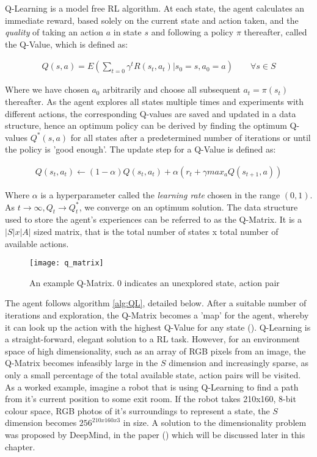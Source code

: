 Q-Learning is a model free RL algorithm. At each state, the agent calculates an immediate reward,
based solely on the current state and action taken, and the \textit{quality} of taking an action $a$
in state $s$ and following a policy $\pi$ thereafter, called the Q-Value, which is defined as:

\begin{align}
    \label{equ:Q}
    Q(s, a) = E(\sum_{t=0}\gamma^tR(s_t, a_t) | s_0 = s, a_0 = a) \qquad \forall s \in S
\end{align}

Where we have chosen $a_0$ arbitrarily and
choose all subsequent $a_t = \pi(s_t)$ thereafter. As the agent explores all states multiple times
and experiments with different actions, the corresponding Q-values are saved and updated in a data
structure, hence an optimum policy can be derived by finding the optimum Q-values $Q^*(s, a)$ for all states after a predetermined number of iterations or until the policy is 'good enough'. The update step for a Q-Value is defined as:

\begin{align}
    \label{equ:QUpdate}
    Q(s_t, a_t) \leftarrow (1-\alpha)Q(s_t, a_t) + \alpha(r_t + \gamma max_aQ(s_{t+1}, a))
\end{align}

Where $\alpha$ is a hyperparameter called the \textit{learning rate} chosen in the range $(0, 1)$. As $t \rightarrow \infty, Q_t \rightarrow Q^*_t$, we converge on an optimum solution. The data structure used to store the agent's experiences can be referred to as the Q-Matrix. It is a
$|S| x |A|$ sized matrix, that is the total number of states x total number of available actions.

\begin{figure}[h]
    \texttt{[image: q\_matrix]}
    \centering
    \caption{An example Q-Matrix. 0 indicates an unexplored state, action pair}
\end{figure}

The agent follows algorithm \ref{alg:QL}, detailed below.
After a suitable number of iterations and exploration, the Q-Matrix becomes a 'map' for the agent,
whereby it can look up the action with the highest Q-Value for any state (\cite{qlearning}).
Q-Learning is a straight-forward, elegant solution to a RL task. However, for an environment space
of high dimensionality, such as an array of RGB pixels from an image, the Q-Matrix becomes
infeasibly large in the $S$ dimension and increasingly sparse, as only a small percentage of the
total available state, action pairs will be visited. As a worked example, imagine a robot that is
using Q-Learning to find a path from it's current position to some exit room. If the robot takes
210x160, 8-bit colour space, RGB photos of it's surroundings to represent a state, the $S$ dimension
becomes $256^{210x160x3}$ in size. A solution to the dimensionality problem was
proposed by DeepMind, in the paper (\cite{deepmind1}) which will be discussed later in this chapter.

